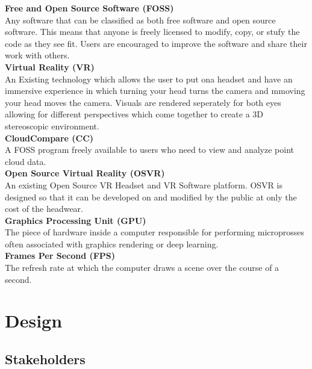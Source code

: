 \documentclass{article}
\begin{document}
{\parindent0pt
\textbf{Free and Open Source Software (FOSS)}\\

Any software that can be classified as both free software and open source software.
This means that anyone is freely licensed to modify, copy, or stufy the code as they see fit.
Users are encouraged to improve the software and share their work with others.\\

\textbf{Virtual Reality (VR)}\\

An Existing technology which allows the user to put ona headset and have an immersive experience in which turning your  head turns the camera and mmoving your head moves the camera.
Visuals are rendered seperately for both eyes allowing for different perspectives which come together to create a 3D stereoscopic environment.\\

\textbf{CloudCompare (CC)}\\

A FOSS program freely available to users who need to view and analyze point cloud data.\\

\textbf{Open Source Virtual Reality (OSVR)}\\

An existing Open Source VR Headset and VR Software platform.
OSVR is designed so that it can be developed on and modified by the public at only the cost of the headwear.\\

\textbf{Graphics Processing Unit (GPU)}\\

The piece of hardware inside a computer responsible for performing microprosses often associated with graphics rendering or deep learning.\\

\textbf{Frames Per Second (FPS)}\\

The refresh rate at which the computer draws a scene over the course of a second.\\
}

\section{Design}

\subsection{Stakeholders}
\end{document}

